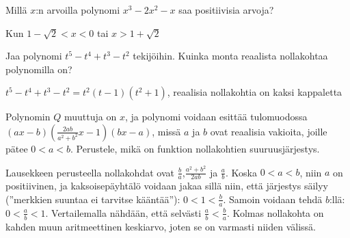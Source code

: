 
\begin{tehtava}
Millä $x$:n arvoilla polynomi $x^3-2x^2-x$ saa positiivisia arvoja?
	\begin{vastaus}
	Kun $1-\sqrt{2}<x<0$ tai $x>1+\sqrt{2}$
	\end{vastaus}
\end{tehtava}

\begin{tehtava}
Jaa polynomi $t^5-t^4+t^3-t^2$ tekijöihin. Kuinka monta reaalista nollakohtaa polynomilla on?
	\begin{vastaus}
	$t^5-t^4+t^3-t^2=t^2(t-1)(t^2+1)$, reaalisia nollakohtia on kaksi kappaletta
	\end{vastaus}
\end{tehtava}

\begin{tehtava}
Polynomin $Q$ muuttuja on $x$, ja polynomi voidaan esittää tulomuodossa $(ax-b)(\frac{2ab}{a^2+b^2}x-1)(bx-a)$, missä $a$ ja $b$ ovat reaalisia vakioita, joille pätee $0<a<b$. Perustele, mikä on funktion nollakohtien suuruusjärjestys.
		\begin{vastaus}
Lausekkeen perusteella nollakohdat ovat $\frac{b}{a}$,$\frac{a^2+b^2}{2ab}$ ja $\frac{a}{b}$. Koska $0<a<b$, niin $a$ on positiivinen, ja kaksoisepäyhtälö voidaan jakaa sillä niin, että järjestys säilyy (''merkkien suuntaa ei tarvitse kääntää''): $0<1<\frac{b}{a}$. Samoin voidaan tehdä $b$:llä: $0<\frac{a}{b}<1$. Vertailemalla nähdään, että selvästi $\frac{a}{b}<\frac{b}{a}$. Kolmas nollakohta on kahden muun aritmeettinen keskiarvo, joten se on varmasti niiden välissä.
%
		\end{vastaus}
\end{tehtava}
\newpage

